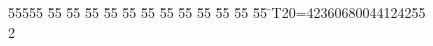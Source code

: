 %
%
\begin{tabbing}
55555 \= 55 \= 55 \= 55 \= 55 \= 55 \= 55 \= 55 \= 55 \= 55 \= 55 \= 55 \= 55 \= \>T20=42360680044124255\\[0pt]
2\>\end{tabbing}
